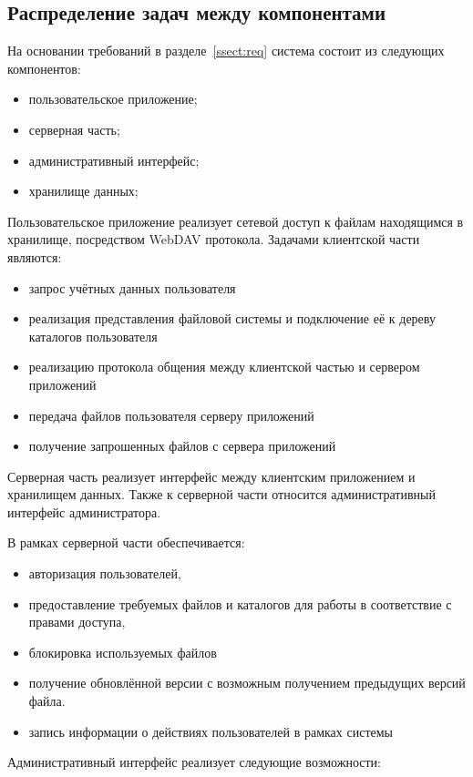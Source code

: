 \documentclass[utf8,usehyperref,12pt]{G7-32}
\begin{document}
\subsection{Распределение задач между компонентами}

На основании требований в разделе~\ref{ssect:req} система состоит из следующих компонентов:
\begin{itemize}
\item пользовательское приложение;
\item серверная часть;
\item административный интерфейс;
\item хранилище данных;
\end{itemize}

Пользовательское приложение реализует сетевой доступ к файлам находящимся в хранилище, посредством WebDAV протокола. Задачами клиентской части являются:
\begin{itemize}
\item запрос учётных данных пользователя
\item реализация представления файловой системы и подключение её к дереву каталогов пользователя
\item реализацию протокола общения между клиентской частью и сервером приложений
\item передача файлов пользователя серверу приложений
\item получение запрошенных файлов с сервера приложений
\end{itemize}

Серверная часть реализует интерфейс между клиентским приложением и хранилищем данных. Также к серверной части относится административный интерфейс администратора.

В рамках серверной части обеспечивается:
\begin{itemize}
\item авторизация пользователей, 
\item предоставление требуемых файлов и каталогов для работы в соответствие с правами доступа, 
\item блокировка используемых файлов 
\item получение обновлённой версии с возможным получением предыдущих версий файла.
\item запись информации о действиях пользователей в рамках системы
 \end{itemize}
 
Административный интерфейс реализует следующие возможности:
\end{document}
